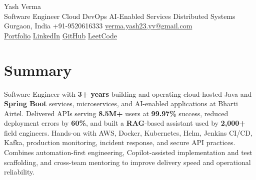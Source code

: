 \documentclass[letterpaper,11pt]{article}
\begin{document}
\begin{center}
  {\Huge Yash Verma} \\
  \small Software Engineer \textperiodcentered{} Cloud \textperiodcentered{} DevOps \textperiodcentered{} AI-Enabled Services \textperiodcentered{} Distributed Systems \\
  \vspace{5pt}
  \small Gurgaon, India \textbar{} +91-9520616333 \textbar{}
  \href{mailto:verma.yash23.yv@gmail.com}{verma.yash23.yv@gmail.com} \\
  \vspace{7pt}
  \href{https://yashverma230600.github.io/yashV-portfolio/}{Portfolio} \textbar{}
  \href{https://www.linkedin.com/in/yash-verma-9243a7193/}{LinkedIn} \textbar{}
  \href{https://github.com/yashverma230600}{GitHub} \textbar{}
  \href{https://leetcode.com/yashverma230600}{LeetCode}
  \vspace{-8pt}
\end{center}

\section{Summary}
\begin{itemize}[leftmargin=0.15in, label={}]
  \small{\item{
    Software Engineer with \textbf{3+ years} building and operating cloud-hosted Java and \textbf{Spring Boot} services, microservices, and AI-enabled applications at Bharti Airtel. Delivered APIs serving \textbf{8.5M+} users at \textbf{99.97\%} success, reduced deployment errors by \textbf{60\%}, and built a \textbf{RAG}-based assistant used by \textbf{2,000+} field engineers. Hands-on with AWS, Docker, Kubernetes, Helm, Jenkins CI/CD, Kafka, production monitoring, incident response, and secure API practices. Combines automation-first engineering, Copilot-assisted implementation and test scaffolding, and cross-team mentoring to improve delivery speed and operational reliability.
  }}
\end{itemize}
\vspace{-8pt}

\end{document}

